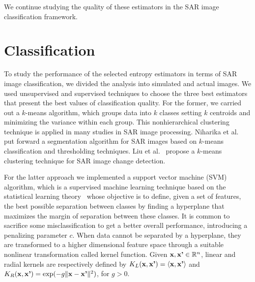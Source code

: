 \documentclass[journal]{IEEEtran}
\begin{document}

We continue studying the quality of these estimators in the SAR image classification framework.


\section{Classification}
\label{Classification}

To study the performance of the selected entropy estimators in terms of  SAR image classification, we divided the analysis into simulated and actual images. 
We used unsupervised and supervised techniques to choose the three best estimators that present the best values of classification quality. 
For the former, we carried out a $k$-means algorithm, which groups data into $k$ classes setting $k$ centroids and minimizing the variance within each group. 
This nonhierarchical clustering technique is applied in many studies in SAR image processing. 
Niharika et al.~\cite{Niharika2017} put forward a segmentation algorithm for SAR images based on $k$-means classification and thresholding techniques. 
Liu et al.~\cite{Liu2019} propose a $k$-means clustering technique for SAR image change detection.

For the latter approach we implemented a support vector machine (SVM) algorithm, which is a supervised machine learning technique based on the statistical learning theory~\cite{Vapnik1995} whose objective is to define, given a set of features,  the best possible separation between classes by finding a hyperplane that maximizes the margin of separation between these classes. It is common to sacrifice some misclassification to get a better overall performance, introducing a penalizing parameter $c$. When data cannot be separated by a hyperplane, they are transformed to a higher dimensional feature space through a suitable nonlinear transformation called kernel function. Given $\textrm{\textbf{x}}, \textrm{\textbf{x'}} \in \mathbb{R}^n$, linear and radial kernels are respectively defined by $K_L(\textrm{\textbf{x}}, \textrm{\textbf{x'}})=\langle \textrm{\textbf{x}}, \textrm{\textbf{x'}} \rangle$ and $K_R(\textrm{\textbf{x}}, \textrm{\textbf{x'}})=\exp(-g\lVert \textrm{\textbf{x}}-\textrm{\textbf{x'}} \rVert^2)$, for $g>0$.
\end{document}
